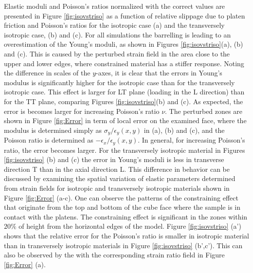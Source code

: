 \documentclass[3p]{elsarticle}
\begin{document}
Elastic moduli and Poisson’s ratios normalized with the correct values are presented in Figure \ref{fig:isovstriso} as a function of relative slippage due to platen friction and Poisson’s ratios for the isotropic case (a) and the transversely isotropic case, (b) and (c). 
For all simulations the
barrelling is leading to an overestimation of the Young's moduli, as shown in Figures \ref{fig:isovstriso}(a), (b) and (c). This is caused by the perturbed strain field in the area close to the upper and lower edges, where constrained material has a stiffer response. Noting the difference in scales of the $y$-axes, it is clear that the errors in Young’s modulus is significantly higher for the isotropic case than for the transversely isotropic case. This effect is larger for LT plane (loading in the L direction) than for the TT plane, comparing Figures \ref{fig:isovstriso}(b) and (c). As expected, the error is becomes larger for increasing Poisson’s ratio $\nu$. The perturbed zones are shown in Figure \ref{fig:Error} in term of local error on the examined face, where the modulus is determined simply as $\sigma_y/{\epsilon_y(x,y)}$ in (a), (b) and (c), and the Poisson ratio is determined as $-\epsilon_x/{\epsilon_y(x,y)}$. 
In general, for increasing Poisson's ratio, the error becomes larger. 
For the transversely isotropic material in Figures
\ref{fig:isovstriso} (b) and (c) the error in Young's moduli is less in
transverse direction T than in the axial direction L.
This difference in behavior can be discussed by examining the spatial variation of elastic parameters determined from strain fields for isotropic and 
transversely isotropic materials shown in Figure 
\ref{fig:Error} (a-c). One can
observe the patterns of the constraining effect that originate from the top
and bottom of the cube face where the sample is in contact with the platens. The constraining effect is significant in the zones within $20\%$ of height
from the horizontal edges of the model. 
Figure \ref{fig:isovstriso} (a’) shows that the relative error for the
Poisson's ratio is smaller in isotropic material than in transversely isotropic
materials in Figure \ref{fig:isovstriso} (b’,c’). This can also be observed
by the with the corresponding strain ratio field in Figure \ref{fig:Error} (a\textprime).
\end{document}
